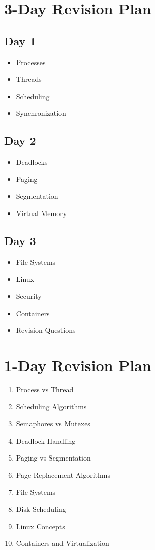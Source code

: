 \section{3-Day Revision Plan}

\subsection*{Day 1}

\begin{itemize}
\item Processes
\item Threads
\item Scheduling
\item Synchronization
\end{itemize}

\subsection*{Day 2}

\begin{itemize}
\item Deadlocks
\item Paging
\item Segmentation
\item Virtual Memory
\end{itemize}

\subsection*{Day 3}

\begin{itemize}
\item File Systems
\item Linux
\item Security
\item Containers
\item Revision Questions
\end{itemize}

\section{1-Day Revision Plan}

\begin{enumerate}
\item Process vs Thread
\item Scheduling Algorithms
\item Semaphores vs Mutexes
\item Deadlock Handling
\item Paging vs Segmentation
\item Page Replacement Algorithms
\item File Systems
\item Disk Scheduling
\item Linux Concepts
\item Containers and Virtualization
\end{enumerate}

